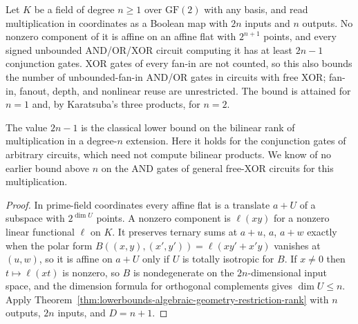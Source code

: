 \begin{theorem}
  \label{thm:lowerbounds-algebraic-field-mul-conjunctions}
  \leanok
  Let $K$ be a field of degree $n\ge1$ over $\mathrm{GF}(2)$ with any basis,
  and read multiplication in coordinates as a Boolean map with $2n$ inputs and
  $n$ outputs. No nonzero component of it is affine on an affine flat with
  $2^{n+1}$ points, and every signed unbounded AND/OR/XOR circuit computing it
  has at least $2n-1$ conjunction gates. XOR gates of every fan-in are not
  counted, so this also bounds the number of unbounded-fan-in AND/OR gates in
  circuits with free XOR; fan-in, fanout, depth, and nonlinear reuse are
  unrestricted. The bound is attained for $n=1$ and, by Karatsuba's three
  products, for $n=2$.

  The value $2n-1$ is the classical lower bound on the bilinear rank of
  multiplication in a degree-$n$ extension. Here it holds for the
  conjunction gates of arbitrary circuits, which need not compute bilinear
  products. We know of no earlier bound above $n$ on the AND gates of
  general free-XOR circuits for this multiplication.
\end{theorem}
\begin{proof}
  \leanok
  In prime-field coordinates every affine flat is a translate $a+U$ of a
  subspace with $2^{\dim U}$ points. A nonzero component is $\ell(xy)$ for a
  nonzero linear functional $\ell$ on $K$. It preserves ternary sums at
  $a+u$, $a$, $a+w$ exactly when the polar form
  $B((x,y),(x',y'))=\ell(xy'+x'y)$ vanishes at $(u,w)$, so it is affine on
  $a+U$ only if $U$ is totally isotropic for $B$. If $x\ne0$ then
  $t\mapsto\ell(xt)$ is nonzero, so $B$ is nondegenerate on the
  $2n$-dimensional input space, and the dimension formula for orthogonal
  complements gives $\dim U\le n$. Apply
  Theorem~\ref{thm:lowerbounds-algebraic-geometry-restriction-rank} with $n$
  outputs, $2n$ inputs, and $D=n+1$.
\end{proof}

